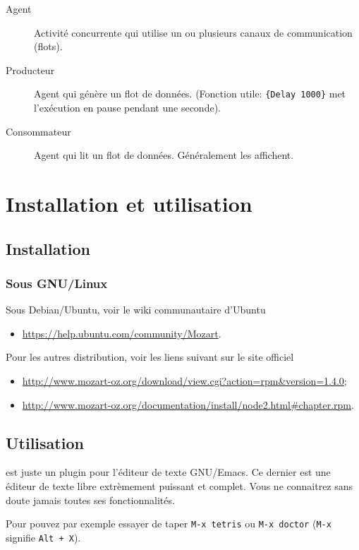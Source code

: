\begin{description}
  \item[Agent]
    Activité concurrente qui utilise un ou
    plusieurs canaux de communication (flots).

  \item[Producteur]
    Agent qui génère un flot de données.
    (Fonction utile: \lstinline|{Delay 1000}|
    met l'exécution en pause pendant une seconde).

  \item[Consommateur]
    Agent qui lit un flot de données. Généralement les affichent.
\end{description}


\annexe
\section{Installation et utilisation}
\subsection{Installation}
\subsubsection{Sous GNU/Linux}
Sous Debian/Ubuntu, voir le wiki communautaire d'Ubuntu
\begin{itemize}
  \item
    \url{https://help.ubuntu.com/community/Mozart}.
\end{itemize}

Pour les autres distribution, voir les liens suivant sur le site officiel
\begin{itemize}
  \item
    \url{http://www.mozart-oz.org/download/view.cgi?action=rpm&version=1.4.0};
  \item
    \url{http://www.mozart-oz.org/documentation/install/node2.html#chapter.rpm}.
\end{itemize}

\subsection{Utilisation}
\mozart{} est juste un plugin pour l'éditeur de texte GNU/Emacs.
Ce dernier est une éditeur de texte libre extrèmement puissant et complet.
Vous ne connaitrez sans doute jamais toutes ses fonctionnalités.

Pour pouvez par exemple essayer de taper \verb|M-x tetris| ou
\verb|M-x doctor| (\verb|M-x| signifie \verb|Alt + X|).

